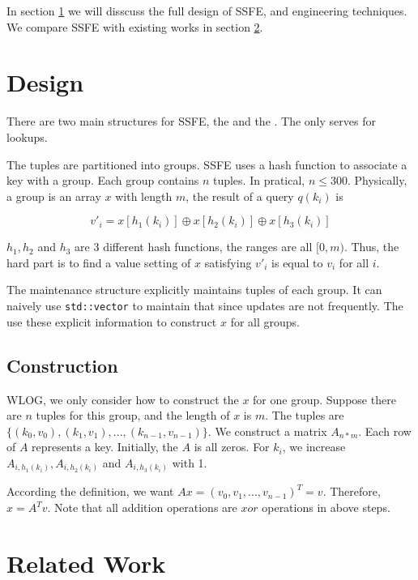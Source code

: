 \documentclass{article}
\begin{document}

In section \ref{sec:design} we will disscuss the full design of SSFE, and engineering techniques. We compare SSFE with existing works in section \ref{sec:related_work}.

\section{Design}
\label{sec:design}

There are two main structures for SSFE, the \qs and the \ms. The \qs only serves for lookups.

\textbf{\qs} The tuples are partitioned into groups. SSFE uses a hash function to associate a key with a group. Each group contains $n$ tuples. In pratical, $n \le 300$. Physically, a group is an array $x$ with length $m$, the result of a query $q(k_i)$ is

$$v'_i = x[h_1(k_i)] \oplus x[h_2(k_i)] \oplus x[h_3(k_i)]$$

$h_1, h_2$ and $h_3$ are 3 different hash functions, the ranges are all $[0, m)$. Thus, the hard part is to find a value setting of $x$ satisfying $v'_i$ is equal to $v_i$ for all $i$.


\textbf{\ms} The maintenance structure explicitly maintains tuples of each group. It can naively use \texttt{std::vector} to maintain that since updates are not frequently. The \ms use these explicit information to construct $x$ for all groups.


\subsection{Construction}
\label{sec:construction}

WLOG, we only consider how to construct the $x$ for one group. Suppose there are $n$ tuples for this group, and the length of $x$ is $m$. The tuples are $\{(k_0, v_0), (k_1, v_1), ..., (k_{n-1}, v_{n-1})\}$. We construct a matrix $A_{n*m}$. Each row of $A$ represents a key. Initially, the $A$ is all zeros. For $k_i$, we increase $A_{i,h_1(k_i)}, A_{i,h_2(k_i)}$ and $A_{i,h_3(k_i)}$ with 1.

According the definition, we want $Ax = (v_0, v_1, ..., v_{n-1})^T = v$. Therefore, $x = A^{T}v$. Note that all addition operations are $xor$ operations in above steps.




\section{Related Work}
\label{sec:related_work}
\end{document}

